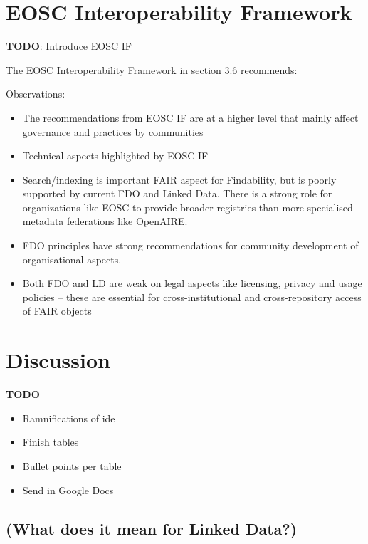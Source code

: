\documentclass[fleqn,10pt,lineno]{wlpeerjlua}
\providecommand{\tightlist}{%
  \setlength{\itemsep}{0pt}\setlength{\parskip}{0pt}}
\begin{document}
\hypertarget{eosc-interoperability-framework}{%
\section*{EOSC Interoperability Framework}\label{eosc-interoperability-framework}}

\textbf{TODO}: Introduce EOSC IF

The EOSC Interoperability Framework \cite{aCye3KpE} in section 3.6 recommends:



Observations:

\begin{itemize}
\tightlist
\item
  The recommendations from EOSC IF are at a higher level that mainly affect governance and practices by communities
\item
  Technical aspects highlighted by EOSC IF
\item
  Search/indexing is important FAIR aspect for Findability, but is poorly supported by current FDO and Linked Data. There is a strong role for organizations like EOSC to provide broader registries than more specialised metadata federations like OpenAIRE.
\item
  FDO principles have strong recommendations for community development of organisational aspects.
\item
  Both FDO and LD are weak on legal aspects like licensing, privacy and usage policies -- these are essential for cross-institutional and cross-repository access of FAIR objects
\end{itemize}

\hypertarget{sec:discussion}{%
\section*{Discussion}\label{sec:discussion}}

\textbf{TODO}

\begin{itemize}
\tightlist
\item
  Ramnifications of ide
\item
  Finish tables
\item
  Bullet points per table
\item
  Send in Google Docs
\end{itemize}

\hypertarget{what-does-it-mean-for-linked-data}{%
\subsection*{(What does it mean for Linked Data?)}\label{what-does-it-mean-for-linked-data}}
\end{document}
